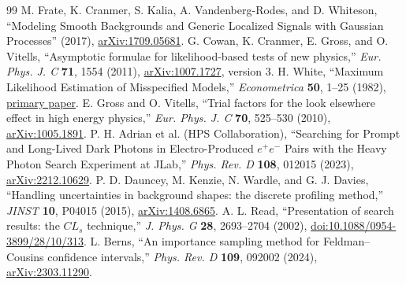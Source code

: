 \documentclass[11pt]{article}
\begin{document}
\clearpage
\begin{thebibliography}{99}
 M. Frate, K. Cranmer, S. Kalia, A. Vandenberg-Rodes,
and D. Whiteson, ``Modeling Smooth Backgrounds and Generic Localized Signals
with Gaussian Processes'' (2017),
\href{https://arxiv.org/abs/1709.05681}{arXiv:1709.05681}.
 G. Cowan, K. Cranmer, E. Gross, and O. Vitells,
``Asymptotic formulae for likelihood-based tests of new physics,''
\emph{Eur. Phys. J. C} \textbf{71}, 1554 (2011),
\href{https://arxiv.org/abs/1007.1727}{arXiv:1007.1727}, version 3.
 H. White, ``Maximum Likelihood Estimation of Misspecified
Models,'' \emph{Econometrica} \textbf{50}, 1--25 (1982),
\href{https://faculty.utrgv.edu/diego.escobari/teaching/Econ8370/Papers/White(1982)Econometrica-Corey.pdf}{primary paper}.
 E. Gross and O. Vitells, ``Trial factors for the look
elsewhere effect in high energy physics,'' \emph{Eur. Phys. J. C}
\textbf{70}, 525--530 (2010),
\href{https://arxiv.org/abs/1005.1891}{arXiv:1005.1891}.
 P. H. Adrian et al. (HPS Collaboration), ``Searching for Prompt
and Long-Lived Dark Photons in Electro-Produced $e^+e^-$ Pairs with the Heavy
Photon Search Experiment at JLab,'' \emph{Phys. Rev. D} \textbf{108}, 012015
(2023), \href{https://arxiv.org/abs/2212.10629}{arXiv:2212.10629}.
 P. D. Dauncey, M. Kenzie, N. Wardle, and G. J. Davies,
``Handling uncertainties in background shapes: the discrete profiling
method,'' \emph{JINST} \textbf{10}, P04015 (2015),
\href{https://arxiv.org/abs/1408.6865}{arXiv:1408.6865}.
 A. L. Read, ``Presentation of search results: the $CL_s$ technique,''
\emph{J. Phys. G} \textbf{28}, 2693--2704 (2002),
\href{https://doi.org/10.1088/0954-3899/28/10/313}{doi:10.1088/0954-3899/28/10/313}.
 L. Berns, ``An importance sampling method for Feldman--Cousins confidence intervals,''
\emph{Phys. Rev. D} \textbf{109}, 092002 (2024),
\href{https://arxiv.org/abs/2303.11290}{arXiv:2303.11290}.
\end{thebibliography}
\end{document}
